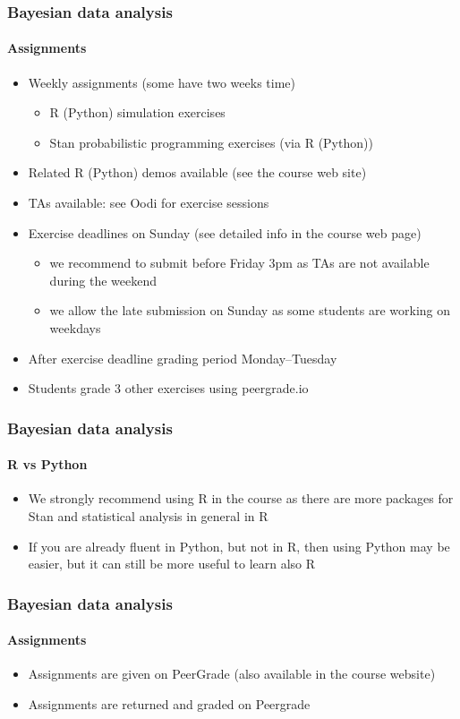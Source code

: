 \documentclass[english]{beamer}
\begin{document}
\begin{frame}
  \frametitle{Bayesian data analysis}  %
  \framesubtitle{Assignments}
  \begin{itemize}
  \item Weekly assignments (some have two weeks time)
    \begin{itemize}
    \item R (Python) simulation exercises
    \item Stan probabilistic programming exercises (via R (Python))
    \end{itemize}
  \item Related R (Python) demos available (see the course web site)
  \item TAs available: see Oodi for exercise sessions
  \item Exercise deadlines on Sunday (see detailed info in the course web page)
    \begin{itemize}
    \item we recommend to submit before Friday 3pm as TAs are not
      available during the weekend
    \item we allow the late submission on Sunday as some students are
      working on weekdays
    \end{itemize}
  \item After exercise deadline grading period Monday--Tuesday
  \item Students grade 3 other exercises using peergrade.io
  \end{itemize}
  
\end{frame}

\begin{frame}
  \frametitle{Bayesian data analysis}  %
  \framesubtitle{R vs Python}

  \begin{itemize}
  \item We strongly recommend using R in the course as there are more
    packages for Stan and statistical analysis in general in R
  \item If you are already fluent in Python, but not in R, then using Python
    may be easier, but it can still be more useful to learn also R
  \end{itemize}
  
\end{frame}

\begin{frame}
  \frametitle{Bayesian data analysis}  %
  \framesubtitle{Assignments}
  \begin{itemize}
  \item Assignments are given on PeerGrade (also available in the course website)
  \item Assignments are returned and graded on Peergrade
  \end{itemize}
\end{frame}
\end{document}
